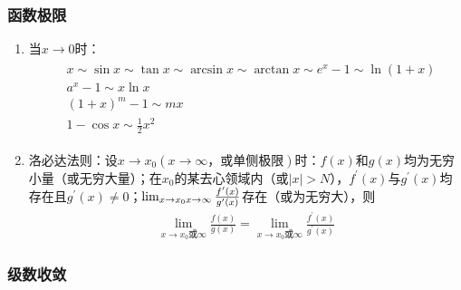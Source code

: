 \documentclass[12pt]{book}
\begin{document}
\subsubsection{函数极限}

\begin{enumerate}[1.]
    \item 当$x\rightarrow 0$时：
    \begin{gather*}
        \begin{aligned}
            & x\sim\sin{x}\sim\tan{x}\sim\arcsin{x}\sim\arctan{x}\sim e^{x}-1 \sim \ln(1+x)\\
            & a^{x}-1 \sim x\ln{x} \\
            & (1+x)^{m}-1 \sim mx  \\
            & 1-\cos{x}\sim \frac{1}{2}x^2
          \end{aligned}
    \end{gather*}
    \item 洛必达法则：设$x\rightarrow x_{0}(x\rightarrow\infty\text{，或单侧极限})$时：$f(x)$和$g(x)$均为无穷小量（或无穷大量）；在$x_0$的某去心领域内（或$|x|>N$），$f^{\prime}(x)$与$g^{\prime}(x)$均存在且$g^{\prime}(x)\neq 0$；$\lim_{x\rightarrow x_{0}\\x\rightarrow\infty}{\frac{f^{\prime}(x)}{g^{\prime}(x)}}$存在（或为无穷大），则
    \begin{gather*}
        \lim_{x\rightarrow x_{0}\text{或}\infty}{\frac{f(x)}{g(x)}}
        = \lim_{x\rightarrow x_{0}\text{或}\infty}{\frac{f^{\prime}(x)}{g^{\prime}(x)}}
    \end{gather*}
\end{enumerate}





\subsubsection{级数收敛}
\end{document}
